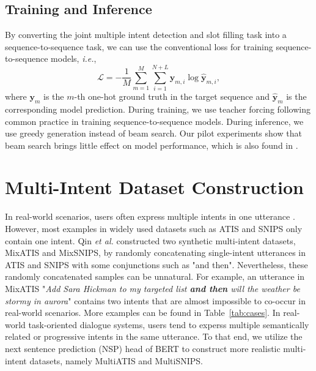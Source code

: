\documentclass[11pt]{article}
\begin{document}
\subsection{Training and Inference}
\label{subsec:training}
By converting the joint multiple intent detection and slot filling task into a sequence-to-sequence task, we can use the conventional loss for training sequence-to-sequence models, \emph{i.e.},
\begin{equation}
    \mathcal{L} = -\frac{1}{M}\sum_{m=1}^{M}\sum_{i=1}^{N+L}\mathbf{y}_{m,i}\log{\hat{\mathbf{y}}_{m,i}},
\end{equation}
where $\mathbf{y}_m$ is the $m$-th one-hot ground truth in the target sequence and $\hat{\mathbf{y}}_m$ is the corresponding model prediction. During training, we use teacher forcing following common practice in training sequence-to-sequence models. During inference, we use greedy generation instead of beam search. Our pilot experiments show that beam search brings little effect on model performance, which is also found in \cite{DBLP:conf/acl/YanGDGZQ20}.

\section{Multi-Intent Dataset Construction}
\label{sec:newdata}

In real-world scenarios, users often express multiple intents in one utterance \cite{DBLP:conf/naacl/GangadharaiahN19}. However, most examples in widely used datasets such as ATIS\cite{DBLP:conf/naacl/HemphillGD90} and SNIPS\cite{Coucke2018SNIPS} only contain one intent. Qin \emph{et al.}\cite{DBLP:conf/emnlp/QinXCL20} constructed two synthetic multi-intent datasets, MixATIS and MixSNIPS, by randomly concatenating single-intent utterances in ATIS and SNIPS with some conjunctions such as "and then". Nevertheless, these randomly concatenated samples can be unnatural. For example, an utterance in MixATIS "\emph{Add Sara Hickman to my targeted list \textbf{and then} will the weather be stormy in aurora}" contains two intents that are almost impossible to co-occur in real-world scenarios. More examples can be found in Table~\ref{tab:cases}. In real-world task-oriented dialogue systems, users tend to experss multiple semantically related or progressive intents in the same utterance. To that end, we utilize the next sentence prediction (NSP) head of BERT\cite{DBLP:conf/naacl/DevlinCLT19} to construct more realistic multi-intent datasets, namely MultiATIS and MultiSNIPS.
\end{document}
